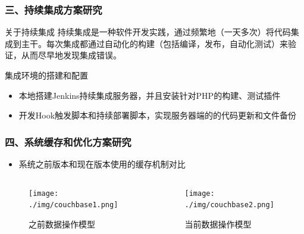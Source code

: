 \documentclass{beamer}
\begin{document}
\begin{frame}
\frametitle{三、持续集成方案研究}
  \begin{block}{关于持续集成}
    持续集成是一种软件开发实践，通过频繁地（一天多次）将代码集成到主干。每次集成都通过自动化的构建（包括编译，发布，自动化测试）来验证，从而尽早地发现集成错误\cite{jenkins1}。
  \end{block}
  \begin{block}{集成环境的搭建和配置}
    \begin{itemize}
      \item 本地搭建Jenkins持续集成服务器，并且安装针对PHP的构建、测试插件
      \item 开发Hook触发脚本和持续部署脚本，实现服务器端的的代码更新和文件备份 
    \end{itemize} 
  \end{block}
\end{frame}

\begin{frame}
\frametitle{四、系统缓存和优化方案研究}
  \begin{itemize}
    \item 系统之前版本和现在版本使用的缓存机制对比
  \end{itemize} 
  \begin{columns}
    \begin{column}{0.50\textwidth}
      \begin{figure}
        \centering
          \texttt{[image: ./img/couchbase1.png]}
        \caption{之前数据操作模型}
        \label{fig:visual}
      \end{figure}
    \end{column}
    \begin{column}{0.50\textwidth}
      \begin{figure}
        \centering
          \texttt{[image: ./img/couchbase2.png]}
        \caption{当前数据操作模型}
        \label{fig:visual}
      \end{figure}
    \end{column}
  \end{columns}
\end{frame}
\end{document}
